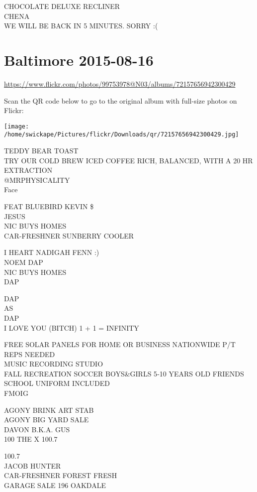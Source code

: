 \documentclass[10pt,letterpaper]{article}
\begin{document}
CHOCOLATE DELUXE RECLINER\\
CHENA\\
WE WILL BE BACK IN 5 MINUTES.  SORRY :(
\pagebreak

\section*{Baltimore 2015-08-16}

\url{https://www.flickr.com/photos/99753978@N03/albums/72157656942300429}

Scan the QR code below to go to the original album with full-size photos on Flickr:

\texttt{[image: /home/swickape/Pictures/flickr/Downloads/qr/72157656942300429.jpg]}
\pagebreak

TEDDY BEAR TOAST\\
TRY OUR COLD BREW ICED COFFEE RICH, BALANCED, WITH A 20 HR EXTRACTION\\
@MRPHYSICALITY\\
Face

FEAT BLUEBIRD KEVIN \$\\
JESUS\\
NIC BUYS HOMES\\
CAR{-}FRESHNER SUNBERRY COOLER

I HEART NADIGAH FENN :)\\
NOEM DAP\\
NIC BUYS HOMES\\
DAP

DAP\\
AS\\
DAP\\
I LOVE YOU (BITCH) 1 + 1 = INFINITY

FREE SOLAR PANELS FOR HOME OR BUSINESS NATIONWIDE P/T REPS NEEDED\\
MUSIC RECORDING STUDIO\\
FALL RECREATION SOCCER BOYS\&GIRLS 5{-}10 YEARS OLD FRIENDS SCHOOL UNIFORM INCLUDED\\
FMOIG

AGONY BRINK ART STAB\\
AGONY BIG YARD SALE\\
DAVON B.K.A. GUS\\
100 THE X 100.7

100.7\\
JACOB HUNTER\\
CAR{-}FRESHNER FOREST FRESH\\
GARAGE SALE 196 OAKDALE
\end{document}
